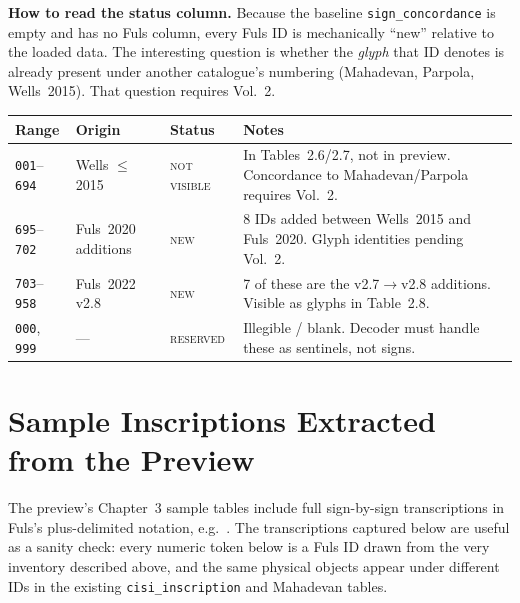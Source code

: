 \documentclass[12pt, a4paper]{article}
\newcommand{\sigid}[1]{\texttt{#1}}
\newcommand{\inscr}[1]{\texttt{\seqsplit{#1}}}
\newcommand{\db}[1]{\texttt{#1}}
\begin{document}
\begin{notebox}
\textbf{How to read the status column.}\enspace
Because the baseline \db{sign\_concordance} is empty and has no
Fuls column, every Fuls ID is mechanically ``new'' relative to
the loaded data.  The interesting question is whether the
\emph{glyph} that ID denotes is already present under another
catalogue's numbering (Mahadevan, Parpola, Wells~2015).
That question requires Vol.~2.
\end{notebox}

\begin{center}
\small
\renewcommand{\arraystretch}{1.2}
\begin{tabular}{@{}l l l p{6.6cm}@{}}
\toprule
\textbf{Range} & \textbf{Origin} & \textbf{Status} & \textbf{Notes}\\
\midrule
\sigid{001}--\sigid{694}
  & Wells $\leq$2015
  & \textsc{not visible}
  & In Tables~2.6/2.7, not in preview.  Concordance to
    Mahadevan/Parpola requires Vol.~2.\\
\sigid{695}--\sigid{702}
  & Fuls~2020 additions
  & \textsc{new}
  & 8 IDs added between Wells~2015 and Fuls~2020.
    Glyph identities pending Vol.~2.\\
\sigid{703}--\sigid{958}
  & Fuls~2022 v2.8
  & \textsc{new}
  & 7 of these are the v2.7$\rightarrow$v2.8 additions.
    Visible as glyphs in Table~2.8.\\
\sigid{000}, \sigid{999}
  & ---
  & \textsc{reserved}
  & Illegible / blank.  Decoder must handle these as
    sentinels, not signs.\\
\bottomrule
\end{tabular}
\end{center}

\section{Sample Inscriptions Extracted from the Preview}
\label{sec:samples}

The preview's Chapter~3 sample tables include full
sign-by-sign transcriptions in Fuls's plus-delimited
notation, e.g.\ \inscr{+a-b-c-+}.  The transcriptions
captured below are useful as a sanity check: every numeric
token below is a Fuls ID drawn from the very inventory
described above, and the same physical objects appear
under different IDs in the existing \db{cisi\_inscription}
and Mahadevan tables.
\end{document}
